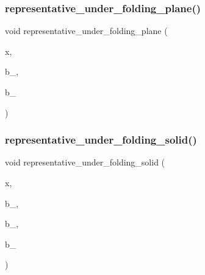 \subsubsection{\texorpdfstring{representative\+\_\+under\+\_\+folding\+\_\+plane()}{representative\_under\_folding\_plane()}}
{\footnotesize\ttfamily void representative\+\_\+under\+\_\+folding\+\_\+plane (\begin{DoxyParamCaption}\item[{\mbox{\hyperlink{galois_8h_a09fddde158a3a20bd2dcadb609de11dc}{I\+NT}} $\ast$}]{x,  }\item[{\mbox{\hyperlink{galois_8h_a09fddde158a3a20bd2dcadb609de11dc}{I\+NT}}}]{b\+\_,  }\item[{\mbox{\hyperlink{galois_8h_a09fddde158a3a20bd2dcadb609de11dc}{I\+NT}}}]{b\+\_ }\end{DoxyParamCaption})}

\mbox{\label{hamming_8_c_a4072ad22e498069f51c32faf6652f243}} 
\subsubsection{\texorpdfstring{representative\+\_\+under\+\_\+folding\+\_\+solid()}{representative\_under\_folding\_solid()}}
{\footnotesize\ttfamily void representative\+\_\+under\+\_\+folding\+\_\+solid (\begin{DoxyParamCaption}\item[{\mbox{\hyperlink{galois_8h_a09fddde158a3a20bd2dcadb609de11dc}{I\+NT}} $\ast$}]{x,  }\item[{\mbox{\hyperlink{galois_8h_a09fddde158a3a20bd2dcadb609de11dc}{I\+NT}}}]{b\+\_,  }\item[{\mbox{\hyperlink{galois_8h_a09fddde158a3a20bd2dcadb609de11dc}{I\+NT}}}]{b\+\_,  }\item[{\mbox{\hyperlink{galois_8h_a09fddde158a3a20bd2dcadb609de11dc}{I\+NT}}}]{b\+\_ }\end{DoxyParamCaption})}

\mbox{\label{hamming_8_c_a2e8b2e1c3009d80a56f3b7ef448baccf}} 
